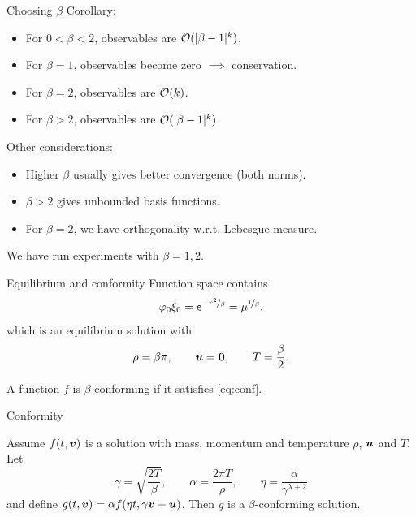 \documentclass[hyperref={bookmarksopen, colorlinks, linkcolor=blue, urlcolor=green, citecolor=red}, color={usenames,dvipsnames}]{beamer}
\newcommand{\good}{\smiley}
\newcommand{\bad}{\frownie}
\begin{document}
\begin{frame}{Choosing $\beta$}
Corollary:
\begin{itemize}
    \item[\good] For $0<\beta<2$, observables are $\mathcal{O}(|\beta-1|^k)$.
    \item[\good\good] For $\beta=1$, observables become zero $\implies$ conservation.
    \item[\bad] For $\beta=2$, observables are $\mathcal{O}(k)$.
    \item[\bad\bad] For $\beta>2$, observables are $\mathcal{O}(|\beta-1|^k)$.
\end{itemize}
Other considerations:
\begin{itemize}[label=]
    \item Higher $\beta$ usually gives better convergence (both norms).
    \item $\beta>2$ gives unbounded basis functions.
    \item For $\beta=2$, we have orthogonality w.r.t. Lebesgue measure.
\end{itemize}
We have run experiments with $\beta=1,2$.
\end{frame}

\begin{frame}{Equilibrium and conformity}
Function space contains
\begin{equation*}
    \varphi_0 \xi_0 = \mathsf{e}^{-\nicefrac{r^2}{\beta}} = \mu^{\nicefrac{1}{\beta}},
\end{equation*}
which is an equilibrium solution with
\begin{equation} \label{eq:conf}
    \rho = \beta\pi, \qquad {\bm u}={\bm0}, \qquad T = \frac{\beta}{2}.
\end{equation}
\begin{definition}
    A function $f$ is $\beta$-conforming if it satisfies \eqref{eq:conf}.
\end{definition}
\end{frame}

\begin{frame}{Conformity}
\begin{theorem}
    Assume $f(t,{\bm v})$ is a solution with mass, momentum and temperature $\rho$, ${\bm u}$ and $T$. Let
    \begin{equation*}
        \gamma = \sqrt{\frac{2T}{\beta}}, \qquad
        \alpha = \frac{2\pi T}{\rho}, \qquad
        \eta = \frac{\alpha}{\gamma^{\lambda+2}}
    \end{equation*}
    and define $g(t,{\bm v}) = \alpha f(\eta t, \gamma {\bm v} + {\bm u})$. Then $g$ is a $\beta$-conforming solution.
\end{theorem}
\end{frame}
\end{document}
